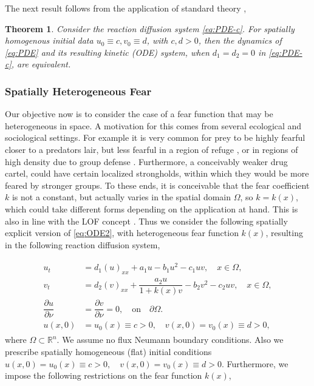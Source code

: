 \documentclass[10pt]{amsart}
\newtheorem{theorem}{Theorem}[section]
\theoremstyle{definition}
\begin{document}
The next result follows from the application of standard theory \cite{kish88},

\begin{theorem}
\label{thm:km1}
	Consider the reaction diffusion system \eqref{eq:PDE-c}. For spatially homogenous initial data $u_{0} \equiv c, v_{0} \equiv d$, with $c,d>0$, then the dynamics of \eqref{eq:PDE} and its resulting kinetic (ODE) system, when $d_{1}=d_{2}=0$ in \eqref{eq:PDE-c}, are equivalent.
\end{theorem}




\subsubsection{Spatially Heterogeneous Fear}

Our objective now is to consider the case of a fear function that may be heterogeneous in space. A motivation for this comes from several ecological and sociological settings. For example it is very common for prey to be highly fearful closer to a predators lair, but less fearful in a region of refuge \cite{Zhang19}, or in regions of high density due to group defense \cite{Samsal20}. Furthermore, a conceivably weaker drug cartel, could have certain localized strongholds, within which they would be more feared by stronger groups. To these ends, it is conceivable that the fear coefficient $k$ is not a constant, but actually varies in the spatial domain $\Omega$, so $k=k(x)$, which could take different forms depending on the application at hand. This is also in line with the LOF concept \cite{Brown99}. Thus we consider the following spatially explicit version of \eqref{eq:ODE2}, with heterogeneous fear function $k(x)$, resulting in the following reaction diffusion system,

\begin{align}\label{eq:PDE}
	\begin{split}
		u_t &= d_1 (u)_{xx} + a_1 u -b_1 u^2 -c_1 uv, \quad x\in \Omega, \\
		v_t &=  d_2 (v)_{xx} +\dfrac{a_2 u}{1+k(x) v}  -b_2 v^2 -c_2 uv,\quad x\in \Omega,  \\
		\dfrac{\partial u}{\partial \nu} & = \dfrac{\partial v}{\partial \nu} =0, \quad \text{on} \quad \partial \Omega.\\
		u(x,0)&=u_0 (x) \equiv c > 0, \quad v(x,0)=v_0(x) \equiv d > 0,
	\end{split}
\end{align}
where $\Omega \subset \mathbb{R}^{n}$. We assume no flux Neumann boundary conditions. Also we prescribe spatially homogeneous (flat) initial conditions
$u(x,0)=u_0 (x) \equiv c > 0, \quad v(x,0)=v_0(x) \equiv d > 0.$ Furthermore, we impose the following restrictions on the fear function $k(x)$,
\end{document}
